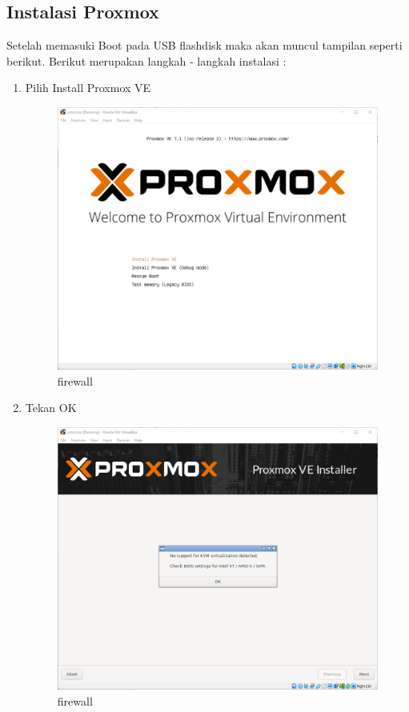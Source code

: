 \documentclass{article}
\begin{document}
  \subsection{Instalasi Proxmox}
  Setelah memasuki Boot pada USB flashdisk maka akan muncul tampilan seperti berikut. Berikut merupakan langkah - langkah instalasi :
  \begin{enumerate}
    \item Pilih Install Proxmox VE
    \begin{figure}[h!]
      \centering
      \includegraphics[width=0.7\linewidth]{proxmox 1.png}
      \caption{firewall}
    \end{figure}
    \newpage
    \item Tekan OK
    \begin{figure}[h!]
      \centering
      \includegraphics[width=0.7\linewidth]{proxmox 2.png}
      \caption{firewall}
    \end{figure}
  \end{enumerate}
\end{document}
